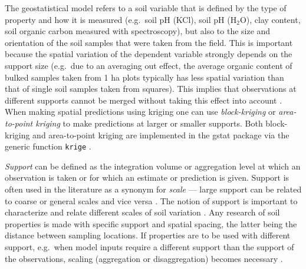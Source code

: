 \documentclass[11pt]{krantz}
\theoremstyle{definition}
\theoremstyle{definition}
\theoremstyle{definition}
\theoremstyle{remark}
\begin{document}
The geostatistical model refers to a soil variable that is defined by
the type of property and how it is measured (e.g.~soil pH (KCl), soil pH
(H\(_2\)O), clay content, soil organic carbon measured with
spectroscopy), but also to the size and orientation of the soil samples
that were taken from the field. This is important because the spatial
variation of the dependent variable strongly depends on the support size
(e.g.~due to an averaging out effect, the average organic content of
bulked samples taken from 1 ha plots typically has less spatial
variation than that of single soil samples taken from squares). This
implies that observations at different supports cannot be merged without
taking this effect into account \citep{Webster2001Wiley}. When making
spatial predictions using kriging one can use \emph{block-kriging}
\citep{Webster2001Wiley} or \emph{area-to-point kriging}
\citep{Kyriakidis2004GEAN1135} to make predictions at larger or smaller
supports. Both block-kriging and area-to-point kriging are implemented
in the gstat package via the generic function \texttt{krige}
\citep{Pebesma2004CG}.

\emph{Support} can be defined as the integration volume or aggregation
level at which an observation is taken or for which an estimate or
prediction is given. Support is often used in the literature as a
synonym for \emph{scale} --- large support can be related to coarse or
general scales and vice versa \citep{Hengl2006CG}. The notion of support
is important to characterize and relate different scales of soil
variation \citep{schabenberger2005statistical}. Any research of soil
properties is made with specific support and spatial spacing, the latter
being the distance between sampling locations. If properties are to be
used with different support, e.g.~when model inputs require a different
support than the support of the observations, scaling (aggregation or
disaggregation) becomes necessary \citep{Heuvelink1999Geoderma}.
\end{document}
